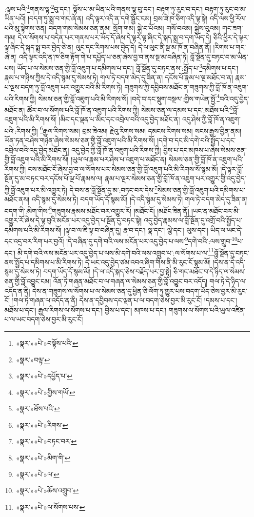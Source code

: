 :ལྟས་པའི་\footnote{«སྣར་»«པེ་»བལྟོས་པའི་}གནས་ལྟ་\footnote{«སྣར་»བལྟ་}བུ་དང་། ལྟོས་པ་མ་ཡིན་པའི་གནས་ལྟ་བུ་དང་། བརྟག་ཏུ་རུང་བ་དང་། བརྟག་ཏུ་རུང་བ་མ་ཡིན་པའོ། །བདག་ཏུ་སྨྲ་བ་གང་ཞེ་ན། འདི་ལྟར་འདི་ན་དགེ་སྦྱོང་ངམ། བྲམ་ཟེ་ཁ་ཅིག་འདི་ལྟ་སྟེ། འདི་ལས་ཕྱི་རོལ་པའི་མུ་སྟེགས་ཅན། བདག་གམ་སེམས་ཅན་ནམ། སྲོག་གམ། སྐྱེ་བ་པོའམ། གསོ་བའམ། སྐྱེས་བུའམ། གང་ཟག་གམ། དེ་ལ་སོགས་པ་བདེན་པར་གནས་པར་ཡོད་དོ་ཞེས་དེ་ལྟར་ལྟ་ཞིང་དེ་སྐད་སྨྲ་བ་དག་ཡོད་དེ། ཅིའི་ཕྱིར་དེ་ལྟར་ལྟ་ཞིང་དེ་སྐད་སྨྲ་བར་བྱེད་ཅེ་ན། ལུང་དང་རིགས་པས་བྱེད་དེ། དེ་ལ་ལུང་ནི་སྔ་མ་ཁོ་ན་བཞིན་ནོ། །རིགས་པ་གང་ཞེ་ན། འདི་ལྟར་འདི་ན་ཁ་ཅིག་རྟོག་གེ་པ་དཔྱོད་པ་ཅན་ཞེས་བྱ་བ་ནས་སྔ་མ་བཞིན་ཏེ། བློ་སྔོན་དུ་བཏང་བ་མ་ཡིན་པས། ཡོད་པ་ལ་སེམས་ཅན་གྱི་བློ་འཇུག་པ་དམིགས་པ་དང་། བློ་སྔོན་དུ་བཏང་ནས་:སྤྱོད་པ་\footnote{«སྣར་»«པེ་»དཔྱོད་པ་}དམིགས་པ་དང་། རྣམ་པ་གཉིས་ཀྱིས་དེ་འདི་སྙམ་དུ་སེམས་ཏེ། གལ་ཏེ་བདག་མེད་དུ་ཟིན་ན། དངོས་པོ་རྣམ་པ་ལྔ་མཐོང་བ་ན། རྣམ་པ་ལྔས་བདག་ཏུ་བློ་འཇུག་པར་འགྱུར་བའི་མི་རིགས་ཏེ། གཟུགས་ཀྱི་དབྱིབས་མཐོང་ན་གཟུགས་ཀྱི་བློ་ཁོ་ན་འཇུག་པའི་རིགས་ཀྱི། སེམས་ཅན་གྱི་བློ་འཇུག་པའི་མི་རིགས་སོ། །བདེ་བ་དང་སྡུག་བསྔལ་:གྱིས་གཡེན་སྤྱོ་\footnote{«སྣར་»«པེ་»གྱིས་གཡོ་}བའི་འདུ་བྱེད་མཐོང་ན། ཚོར་བ་ལ་སོགས་པའི་བློ་ཁོ་ན་འཇུག་པའི་རིགས་ཀྱི། སེམས་ཅན་ལ་དམས་པ་དང་:མཐོས་པའི་\footnote{«སྣར་»ཐོས་པའི་}བློ་འཇུག་པའི་མི་རིགས་སོ། །མིང་དང་ལྡན་པ་མིང་དང་འབྲེལ་བའི་འདུ་བྱེད་མཐོང་ན། འདུ་ཤེས་ཀྱི་བློ་ཁོ་ན་འཇུག་པའི་:རིགས་ཀྱི། \footnote{«སྣར་»«པེ་»རིགས་}རྒྱལ་རིགས་སམ། བྲམ་ཟེའམ། རྗེའུ་རིགས་སམ། དམངས་རིགས་སམ། སངས་རྒྱས་བྱིན་ནམ། ཡོན་ཏན་བཤེས་གཉེན་ཞེས་སེམས་ཅན་གྱི་བློ་འཇུག་པའི་མི་རིགས་སོ། །དགེ་བ་དང་མི་དགེ་བའི་སྤྱོད་པ་དང་འབྲེལ་བའི་འདུ་བྱེད་མཐོང་ན། འདུ་བྱེད་ཀྱི་བློ་ཁོ་ན་འཇུག་པའི་རིགས་ཀྱི། བྱིས་པ་དང་མཁས་པ་ཞེས་སེམས་ཅན་གྱི་བློ་འཇུག་པའི་མི་རིགས་སོ། །ཡུལ་ལ་རྣམ་པར་ཤེས་པ་འཇུག་པ་མཐོང་ན། སེམས་ཅན་གྱི་བློ་ཁོ་ན་འཇུག་པའི་རིགས་ཀྱི། ངས་མཐོང་ངོ་ཞེས་བྱ་བ་ལ་སོགས་པར་སེམས་ཅན་གྱི་བློ་འཇུག་པའི་མི་རིགས་སོ་སྙམ་མོ། །དེ་ལྟར་བློ་སྔོན་དུ་མ་བཏང་བར་དངོས་པོ་ལྔ་པོ་རྣམས་ལ། རྣམ་པ་ལྔར་སེམས་ཅན་གྱི་བློ་ཁོ་ན་འཇུག་པར་འགྱུར་གྱི་འདུ་བྱེད་ཀྱི་བློ་འཇུག་པར་མི་འགྱུར་ཏེ། དེ་བས་ན་བློ་སྔོན་དུ་མ་:བཏང་བར་དེས་\footnote{«སྣར་»«པེ་»བཏང་བར་}སེམས་ཅན་གྱི་བློ་འཇུག་པའི་དམིགས་པ་མཐོང་ནས། འདི་སྙམ་དུ་སེམས་ཏེ། བདག་ཡོད་དོ་སྙམ་མོ། །དེ་འདི་སྙམ་དུ་སེམས་ཏེ། གལ་ཏེ་བདག་མེད་དུ་ཟིན་ན། བདག་གི་:མིག་གིས་\footnote{«སྣར་»«པེ་»མིག་གི་}གཟུགས་རྣམས་མཐོང་བར་འགྱུར་རོ། །མཐོང་ངོ། །མཐོང་ཟིན་ནོ། །ཡང་ན་མཐོང་བར་མི་འགྱུར་རོ་ཞེས་དེ་ལྟ་བུའི་མངོན་པར་འདུ་བྱེད་པ་སྔོན་དུ་བཏང་སྟེ། འདུ་བྱེད་རྣམས་ལ་བློ་སྔོན་དུ་འགྲོ་བའི་སྤྱོད་པ་དམིགས་པའི་མི་རིགས་སོ། །ལྟ་བ་ལ་ཇི་ལྟ་བ་བཞིན་དུ། རྣ་བ་དང་། སྣ་དང་། ལྕེ་དང་། ལུས་དང་། ཡིད་ལ་ཡང་དེ་དང་འདྲ་བར་རིག་པར་བྱའོ། །དེ་བཞིན་དུ་དགེ་བའི་ལས་མངོན་པར་འདུ་བྱེད་པ་ལས་\footnote{«སྣར་»«པེ་»ལ་}དགེ་བའི་:ལས་གྲུབ་\footnote{«སྣར་»«པེ་»ཆོས་འགྲུབ་}པ་དང་། མི་དགེ་བའི་ལས་མངོན་པར་འདུ་བྱེད་པ་ལས་མི་དགེ་བའི་ལས་འགྲུབ་པ་:ལ་སོགས་པ་ལ་\footnote{«སྣར་»«པེ་»ལ་སོགས་པས་}བློ་སྔོན་དུ་བཏང་ནས་སྤྱོད་པ་དམིགས་པ་མི་རིགས་ཏེ། དེ་ཡང་འདུ་བྱེད་ཙམ་འབའ་ཞིག་གིས་ནི་མི་རུང་ངོ་སྙམ་མོ། །དེས་ན་དེ་འདི་སྙམ་དུ་སེམས་ཏེ། བདག་ཡོད་དོ་སྙམ་མོ། །དེ་ལ་འདི་སྐད་ཅེས་བརྗོད་པར་བྱ་སྟེ། ཅི་གང་མཐོང་བ་དེ་ཉིད་ལ་སེམས་ཅན་གྱི་བློ་འབྱུང་ངམ། འོན་ཏེ་གཞན་མཐོང་བ་ལ་གཞན་ལ་སེམས་ཅན་གྱི་བློ་འབྱུང་བར་འདོད། གལ་ཏེ་དེ་ཉིད་ལ་འདོད་ན་ནི། དེས་ན་གཟུགས་ལ་སོགས་པ་ལ་སེམས་ཅན་དུ་ཕྱིན་ཅི་ལོག་ཏུ་གྱུར་པས་བདག་ཡོད་ཅེས་བྱར་མི་རུང་ངོ། །གལ་ཏེ་གཞན་ལ་འདོད་ན་ནི། དེས་ན་དབྱིབས་དང་ལྡན་པ་ལ་བདག་ཅེས་བྱར་མི་རུང་ངོ། །དམས་པ་དང་། མཐོས་པ་དང་། རྒྱལ་རིགས་ལ་སོགས་པ་དང་། བྱིས་པ་དང་། མཁས་པ་དང་། གཟུགས་ལ་སོགས་པའི་ཡུལ་འཛིན་པ་ལ་ཡང་བདག་ཅེས་བྱར་མི་རུང་ངོ། 